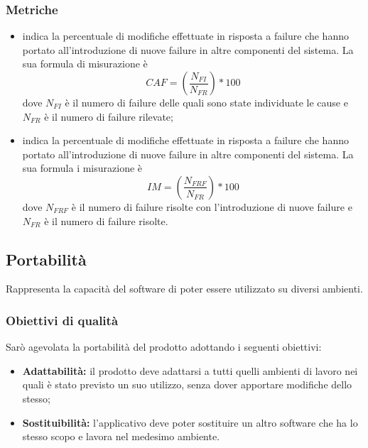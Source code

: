 \documentclass[PianoDiQualifica.tex]{subfiles}
\begin{document}
\subsubsection{Metriche}
\begin{itemize}
	\item {} indica la percentuale di modifiche effettuate in risposta a failure che hanno portato all'introduzione di nuove failure in altre componenti del sistema. La sua formula di misurazione è \[CAF=(\frac{N_{FI}}{N_{FR}})*100\] dove $ N_{FI} $ è il numero di failure delle quali sono state individuate le cause e $ N_{FR} $ è il numero di failure rilevate;
	\item {} indica la percentuale di modifiche effettuate in risposta a failure che hanno portato all'introduzione di nuove failure in altre componenti del sistema. La sua formula i misurazione è \[IM=(\frac{N_{FRF}}{N_{FR}})*100\] dove $ N_{FRF} $ è il numero di failure risolte con l'introduzione di nuove failure e $ N_{FR} $ è il numero di failure risolte.
\end{itemize}
\subsection{Portabilità}
Rappresenta la capacità del software di poter essere utilizzato su diversi ambienti.
\subsubsection{Obiettivi di qualità}
Sarò agevolata la portabilità del prodotto adottando i seguenti obiettivi:
\begin{itemize}
	\item \textbf{Adattabilità:} il prodotto deve adattarsi a tutti quelli ambienti di lavoro nei quali è stato previsto un suo utilizzo, senza dover apportare modifiche dello stesso;
	\item \textbf{Sostituibilità:} l'applicativo deve poter sostituire un altro software che ha lo stesso scopo e lavora nel medesimo ambiente.
\end{itemize}
\end{document}
